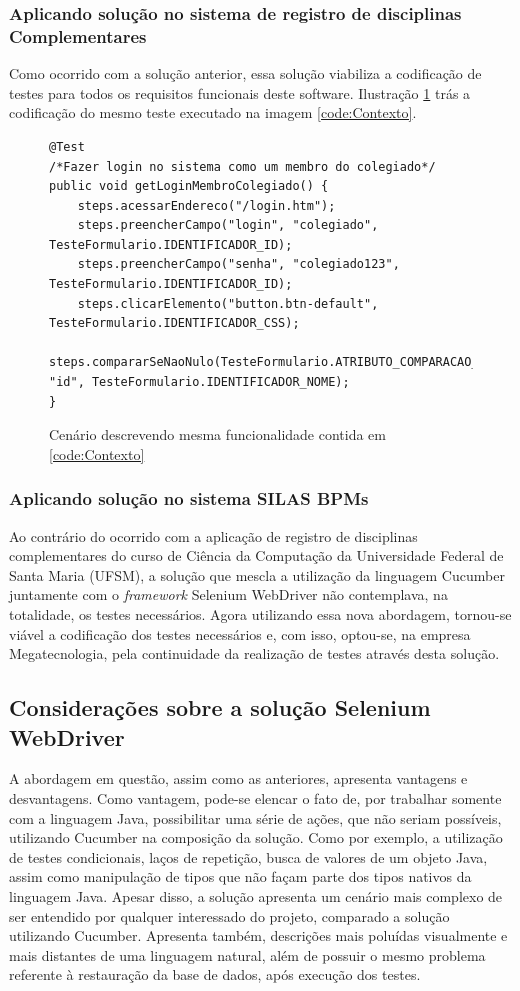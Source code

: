 \documentclass[tg]{mdtufsm}
\begin{document}
\subsubsection{Aplicando solução no sistema de registro de disciplinas Complementares}
Como ocorrido com a solução anterior, essa solução viabiliza a codificação de testes para todos os requisitos funcionais deste software. Ilustração \ref{code:seleniumPiec} trás a codificação do mesmo teste executado na imagem \ref{code:Contexto}.

\begin{figure}[!htt]
	\begin{lstlisting}
@Test
/*Fazer login no sistema como um membro do colegiado*/
public void getLoginMembroColegiado() {
    steps.acessarEndereco("/login.htm");
    steps.preencherCampo("login", "colegiado", TesteFormulario.IDENTIFICADOR_ID);
    steps.preencherCampo("senha", "colegiado123", TesteFormulario.IDENTIFICADOR_ID);
    steps.clicarElemento("button.btn-default", TesteFormulario.IDENTIFICADOR_CSS);
    steps.compararSeNaoNulo(TesteFormulario.ATRIBUTO_COMPARACAO_ASSERT_NOME_TAG, "id", TesteFormulario.IDENTIFICADOR_NOME);
}
	\end{lstlisting}
	\caption{Cenário descrevendo mesma funcionalidade contida em \ref{code:Contexto}}
	\label{code:seleniumPiec}
\end{figure}

\subsubsection{Aplicando solução no sistema SILAS BPMs}
Ao contrário do ocorrido com a aplicação de registro de disciplinas complementares do curso de Ciência da Computação da Universidade Federal de Santa Maria (UFSM), a solução que mescla a utilização da linguagem Cucumber juntamente com o \emph{framework} Selenium WebDriver não contemplava, na totalidade, os testes necessários. Agora utilizando essa nova abordagem, tornou-se viável a codificação dos testes necessários e, com isso, optou-se, na empresa Megatecnologia, pela continuidade da realização de testes através desta solução.

\subsection{Considerações sobre a solução Selenium WebDriver}
A abordagem em questão, assim como as anteriores, apresenta vantagens e desvantagens. Como vantagem, pode-se elencar o fato de, por trabalhar somente com a linguagem Java, possibilitar uma série de ações, que não seriam possíveis, utilizando Cucumber na composição da solução. Como por exemplo, a utilização de testes condicionais, laços de repetição, busca de valores de um objeto Java, assim como manipulação de tipos que não façam parte dos tipos nativos da linguagem Java. Apesar disso, a solução apresenta um cenário mais complexo de ser entendido por qualquer interessado do projeto, comparado a solução utilizando Cucumber. Apresenta também, descrições mais poluídas visualmente e mais distantes de uma linguagem natural, além de possuir o mesmo problema referente à restauração da base de dados, após execução dos testes.
\end{document}
